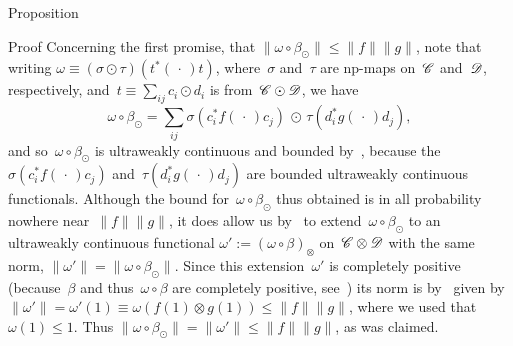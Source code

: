 \documentclass[a]{subfiles}
\begin{document}
\begin{parsec}
\begin{point}{Proposition}
\begin{point}{Proof}
Concerning the first
promise, that $\|\omega\circ \beta_\odot\|\leq \|f\|\|g\|$,
note that writing
$\omega\equiv (\sigma\odot\tau)(t^*(\,\cdot\,)t)$,
where~$\sigma$ and~$\tau$
are np-maps on~$\mathscr{C}$ and~$\mathscr{D}$, respectively,
and~$t\equiv\sum_{ij} c_i \odot d_i$
is from~$\mathscr{C}\odot\mathscr{D}$,
we have 
\begin{equation*}
	\omega\circ\beta_\odot
= \textstyle \sum_{ij} \sigma(c_i^* f(\,\cdot\,)c_j)\,\odot\,
\tau(d_i^* g(\,\cdot\,)d_j),
\end{equation*}
and so~$\omega\circ \beta_\odot$
is ultraweakly continuous and bounded
by~,
because the $\sigma(c_i^*f(\,\cdot\,)c_j)$
and~$\tau(d_i^*g(\,\cdot\,)d_j)$
are bounded ultraweakly continuous functionals.
Although the bound for~$\omega\circ\beta_\odot$ 
thus obtained is in all probability nowhere near~$\|f\|\|g\|$,
it does allow
us by~
to extend~$\omega\circ\beta_\odot$
to an ultraweakly continuous 
functional $\omega':=(\omega\circ\beta)_\otimes$ on~$\mathscr{C}\otimes \mathscr{D}$
with the same norm, $\|\omega'\|=\|\omega\circ\beta_\odot\|$.
Since this extension~$\omega'$
is completely positive
(because~$\beta$ and thus~$\omega\circ \beta$ are completely positive,
see~)
its norm is by~ given by~$\|\omega'\|=\omega'(1)\equiv
\omega(f(1)\otimes g(1))\leq \|f\|\|g\|$,
where we used that~$\omega(1)\leq 1$.
Thus $\|\omega\circ \beta_\odot\|=\|\omega'\| \leq \|f\|\|g\|$,
as was claimed.


\end{point}
\end{point}
\end{parsec}
\end{document}
